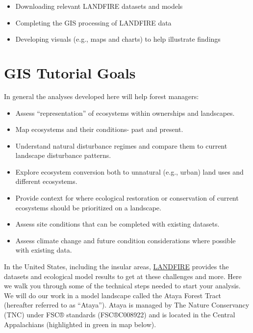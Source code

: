 \documentclass[
]{book}
\providecommand{\tightlist}{%
  \setlength{\itemsep}{0pt}\setlength{\parskip}{0pt}}
\begin{document}
\begin{itemize}
\tightlist
\item
  Downloading relevant LANDFIRE datasets and models
\item
  Completing the GIS processing of LANDFIRE data
\item
  Developing visuals (e.g., maps and charts) to help illustrate findings
\end{itemize}

\hypertarget{gis-tutorial-goals}{%
\section{GIS Tutorial Goals}\label{gis-tutorial-goals}}

In general the analyses developed here will help forest managers:

\begin{itemize}
\tightlist
\item
  Assess ``representation'' of ecosystems within ownerships and landscapes.
\item
  Map ecosystems and their conditions- past and present.
\item
  Understand natural disturbance regimes and compare them to current landscape disturbance patterns.
\item
  Explore ecosystem conversion both to unnatural (e.g., urban) land uses and different ecosystems.
\item
  Provide context for where ecological restoration or conservation of current ecosystems should be prioritized on a landscape.\\
\item
  Assess site conditions that can be completed with existing datasets.
\item
  Assess climate change and future condition considerations where possible with existing data.
\end{itemize}

In the United States, including the insular areas, \href{https://www.landfire.gov/}{LANDFIRE} provides the datasets and ecological model results to get at these challenges and more. Here we walk you through some of the technical steps needed to start your analysis. We will do our work in a model landscape called the Ataya Forest Tract (hereafter referred to as ``Ataya''). Ataya is managed by The Nature Conservancy (TNC) under FSC® standards (FSC®C008922) and is located in the Central Appalachians (highlighted in green in map below).
\end{document}
